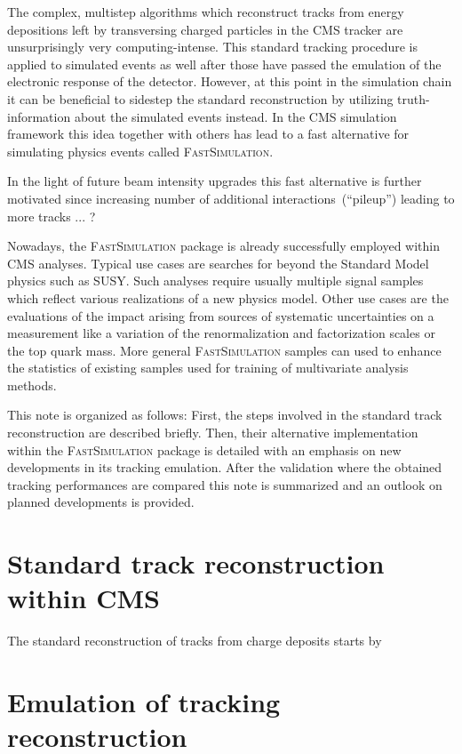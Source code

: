 \documentclass[a4paper]{jpconf}
\begin{document}
The complex, multistep algorithms which reconstruct tracks from energy depositions left by transversing charged particles in the CMS tracker are unsurprisingly very computing-intense. This standard tracking procedure is applied to simulated events as well after those have passed the emulation of the electronic response of the detector. However, at this point in the simulation chain it can be beneficial to sidestep the standard reconstruction by utilizing truth-information about the simulated events instead. In the CMS simulation framework this idea together with others has lead to a fast alternative for simulating physics events called \textsc{FastSimulation}. 

In the light of future beam intensity upgrades this fast alternative is further motivated since increasing number of additional interactions~(``pileup'') leading to more tracks ... ?

Nowadays, the \textsc{FastSimulation} package is already successfully employed within CMS analyses. Typical use cases are searches for beyond the Standard Model physics such as SUSY. Such analyses require usually multiple signal samples which reflect various realizations of a new physics model. Other use cases are the evaluations of the impact arising from sources of systematic uncertainties on a measurement like a variation of the renormalization and factorization scales or the top quark mass. More general \textsc{FastSimulation} samples can used to enhance the statistics of existing samples used for training of multivariate analysis methods.

This note is organized as follows: First, the steps involved in the standard track reconstruction are described briefly. Then, their alternative implementation within the \textsc{FastSimulation} package is detailed with an emphasis on new developments in its tracking emulation. After the validation where the obtained tracking performances are compared this note is summarized and an outlook on planned developments is provided.

\section{Standard track reconstruction within CMS}

The standard reconstruction of tracks from charge deposits starts by 

\section{Emulation of tracking reconstruction}
\end{document}
